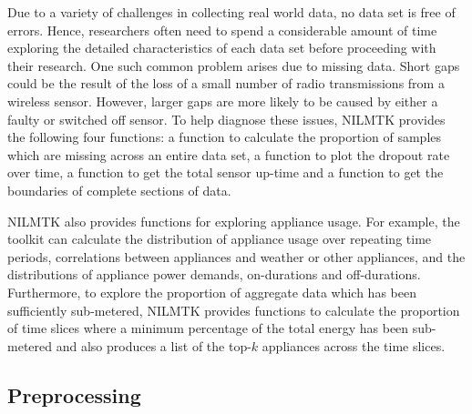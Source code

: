 \documentclass{sig-alternate}
\newcommand{\bluecolor}[1]{\textcolor{blue}{#1}}
\begin{document}
\noindent
Due to a variety of challenges in collecting real world data, no data set is free of errors. Hence, researchers often need to spend a considerable amount of time exploring the detailed characteristics of each data set before proceeding with their research. One such common problem arises due to missing data.  Short gaps could be the result of 
the loss of a small number of radio transmissions from a wireless sensor. However, larger gaps are more likely to be caused by either a faulty or switched off sensor.
To help diagnose these issues, NILMTK provides the following four functions: a function to calculate the proportion of samples which are missing across an entire data set, %
a function to plot the dropout rate over time, a function to get the total sensor up-time and a function to get the boundaries of complete sections of data. %

NILMTK also provides functions for exploring appliance usage.  For example, the toolkit can calculate the distribution of appliance usage over repeating time periods, correlations between appliances and weather or other appliances, and the distributions of appliance power demands, on-durations and off-durations.  Furthermore, to explore the proportion of aggregate data which has been sufficiently sub-metered, NILMTK provides functions to calculate the proportion of time slices where a minimum percentage of the total energy has been sub-metered and also produces a list of the top-$k$ appliances across the time slices.

\subsection{Preprocessing}
\label{sec:preprocessing}
\end{document}
